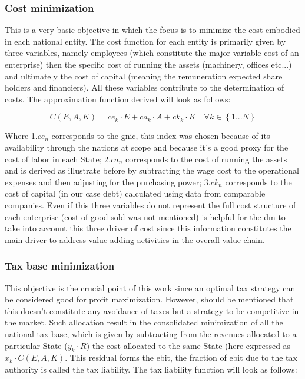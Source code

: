 \begin{doublespace}
\subsubsection{Cost minimization}
This is a very basic objective in which the focus is to  minimize the cost embodied in each national entity. The cost function for each entity is primarily given by three variables, namely employees (which constitute the major variable cost of an enterprise) then the specific cost of running the assets (machinery, offices etc...) and ultimately the cost of capital (meaning the remuneration expected share holders and financiers). All these variables contribute to the determination of costs. The approximation function derived will look as follows:

\begin{equation}
C(E,A,K)=ce_k\cdot E+ca_k\cdot A+ck_k\cdot K \quad \forall k \in \left\{1...N\right\}
\end{equation}

Where 1.$ce_n$ corresponds to the \gls{gnic}, this index was chosen because of its availability through the nations at scope and because it's a good proxy for the cost of labor in each State; 2.$ca_n$ corresponds to the cost of running the assets and is derived as illustrate before by subtracting the wage cost to the operational expenses and then adjusting for the purchasing power; 3.$ck_n$ corresponds to the cost of capital (in our case debt) calculated using data from comparable companies.
Even if this three variables do not represent the full cost structure of each enterprise (cost of good sold was not mentioned) is helpful for the \gls{dm} to take into account this three driver of cost since this information constitutes the main driver to address value adding activities in the overall value chain.

\subsubsection{Tax base minimization}
This objective is the crucial point of this work since an optimal tax strategy can be considered good for profit maximization. However, should be mentioned that this doesn't constitute any avoidance of taxes but a strategy to be competitive in the market. Such allocation result in the consolidated minimization of all the national tax base, which is given by subtracting from the revenues allocated to a particular State ($y_k \cdot R$) the cost allocated to the same State (here expressed as $x_k \cdot C(E, A,K)$. This residual forms the \gls{ebit}, the fraction of \gls{ebit} due to the tax authority is called the tax liability. The tax liability function will look as follows:


\end{doublespace}
